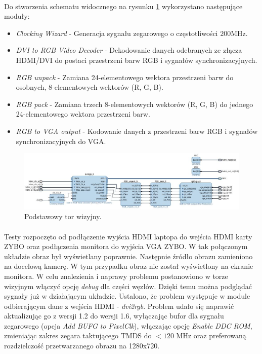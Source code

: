 \paragraph*{}
Do stworzenia schematu widocznego na rysunku \ref{fig:tor_wizyjny} wykorzystano następujące moduły:\begin{itemize}
\item \textit{Clocking Wizard} - Generacja sygnału zegarowego o częstotliwości \(200\)MHz.
\item \textit{DVI to RGB Video Decoder} - Dekodowanie danych odebranych ze złącza HDMI/DVI do postaci przestrzeni barw RGB i sygnałów synchronizacyjnych.
\item \textit{RGB unpack} - Zamiana 24-elementowego wektora przestrzeni barw do osobnych, 8-elementowych wektorów (R, G, B).
\item \textit{RGB pack} - Zamiana trzech 8-elementowych wektorów (R, G, B) do jednego 24-elementowego wektora przestrzeni barw.
\item \textit{RGB to VGA output} - Kodowanie danych z przestrzeni barw RGB i sygnałów synchronizacyjnych do VGA.
\end{itemize}

\begin{figure}[h]
	\centering
	\includegraphics[width=6in]{Tor_wizyjny.jpg}
	\caption{Podstawowy tor wizyjny.}
	\label{fig:tor_wizyjny}
\end{figure}

\paragraph*{}
Testy rozpoczęto od podłączenie wyjścia HDMI laptopa do wejścia HDMI karty ZYBO oraz podłączenia monitora do wyjścia VGA ZYBO. W tak połączonym układzie obraz był wyświetlany poprawnie. Następnie źródło obrazu zamieniono na docelową kamerę. 
W tym przypadku obraz nie został wyświetlony na ekranie monitora. 
W celu znalezienia i naprawy problemu postanowiono w torze wizyjnym włączyć opcję \textit{debug} dla części węzłów. 
Dzięki temu można podglądać sygnały już w działającym układzie.
Ustalono, że problem występuje w module odbierającym dane z wejścia HDMI - \textit{dvi2rgb}. 
Problem udało się naprawić aktualizując go z wersji 1.2 do wersji 1.6, wyłączając bufor dla sygnału zegarowego (opcja \textit{Add BUFG to PixelClk}), włączając opcję \textit{Enable DDC ROM}, zmieniając zakres zegara taktującego TMDS do \(<120\) MHz oraz preferowaną rozdzielczość przetwarzanego obrazu na 1280x720.

